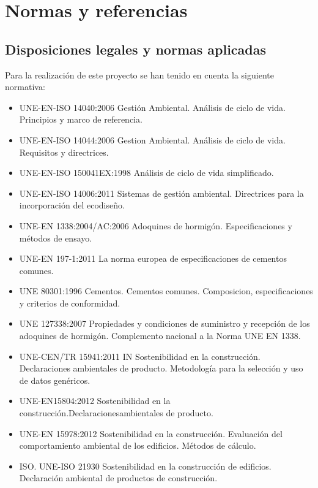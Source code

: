 \chapter{Normas y referencias}\label{cap:normas}
\section{Disposiciones legales y normas aplicadas}

Para la realización de este proyecto se han tenido en cuenta la siguiente normativa:

\begin{itemize}
  \item UNE-EN-ISO 14040:2006 Gestión Ambiental. Análisis de ciclo de vida. Principios y marco de referencia.
  \item UNE-EN-ISO 14044:2006 Gestion Ambiental. Análisis de ciclo de vida. Requisitos y directrices.
  \item UNE-EN-ISO 150041EX:1998 Análisis de ciclo de vida simplificado.
  \item UNE-EN-ISO 14006:2011 Sistemas de gestión ambiental. Directrices para la incorporación del ecodiseño.
  \item UNE-EN 1338:2004/AC:2006 Adoquines de hormigón. Especificaciones y métodos de ensayo.
  \item UNE-EN 197-1:2011 La norma europea de especificaciones de cementos comunes.
  \item UNE 80301:1996 Cementos. Cementos comunes. Composicion, especificaciones y criterios de conformidad.
  \item UNE 127338:2007 Propiedades y condiciones de suministro y recepción de los adoquines de hormigón. Complemento nacional a la Norma UNE EN 1338.
  \item UNE-CEN/TR 15941:2011 IN Sostenibilidad en la construcción. Declaraciones ambientales de producto. Metodología para la selección y uso de datos genéricos.
  \item UNE-EN15804:2012 Sostenibilidad en la construcción.Declaracionesambientales de producto.
  \item UNE-EN 15978:2012 Sostenibilidad en la construcción. Evaluación del comportamiento ambiental de los edificios. Métodos de cálculo.
  \item ISO. UNE-ISO 21930 Sostenibilidad en la construcción de edificios. Declaración ambiental de productos de construcción.
\end{itemize}

